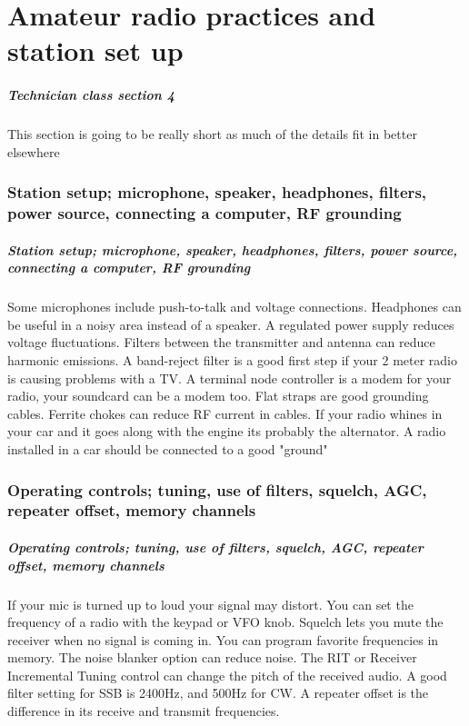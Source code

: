 \documentclass[10pt]{beamer}
\begin{document}
\part{Amateur radio practices and station set up}
\begin{frame}
\frametitle{Technician class section 4}
This section is going to be really short as much of the details fit in better elsewhere
\end{frame}
\section{Station setup; microphone, speaker, headphones, filters, power source, connecting a computer, RF grounding}
\begin{frame}
\frametitle{Station setup; microphone, speaker, headphones, filters, power source, connecting a computer, RF grounding}
Some microphones include push-to-talk and voltage connections. Headphones can be useful in a noisy area instead of a speaker. A regulated power supply reduces voltage fluctuations. Filters between the transmitter and antenna can reduce harmonic emissions. A band-reject filter is a good first step if your 2 meter radio is causing problems with a TV. A terminal node controller is a modem for your radio, your soundcard can be a modem too. Flat straps are good grounding cables. Ferrite chokes can reduce RF current in cables. If your radio whines in your car and it goes along with the engine its probably the alternator. A radio installed in a car should be connected to a good "ground"
\end{frame}

\section{Operating controls; tuning, use of filters, squelch, AGC, repeater offset, memory channels}
\begin{frame}
\frametitle{Operating controls; tuning, use of filters, squelch, AGC, repeater offset, memory channels}
If your mic is turned up to loud your signal may distort. You can set the frequency of a radio with the keypad or VFO knob. Squelch lets you mute the receiver when no signal is coming in. You can program favorite frequencies in memory. The noise blanker option can reduce noise. The RIT or Receiver Incremental Tuning control can change the pitch of the received audio. A good filter setting for SSB is 2400Hz, and 500Hz for CW. A repeater offset is the difference in its receive and transmit frequencies.
\end{frame}
\end{document}
